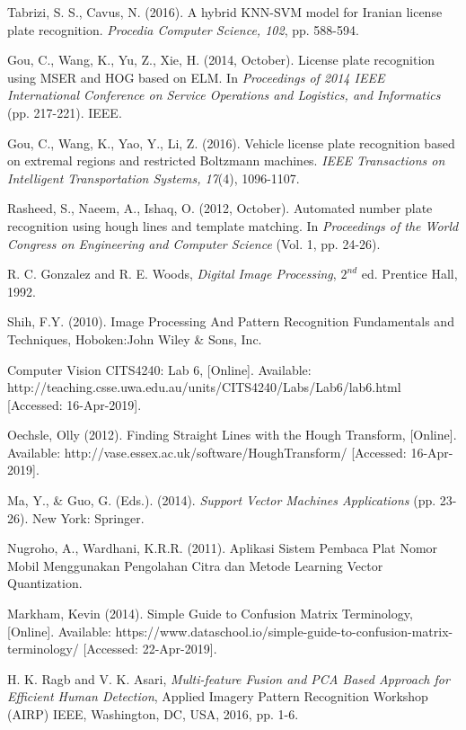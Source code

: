 \begin{thebibliography}{7}

{Tabrizi, S. S., Cavus, N. (2016). A hybrid KNN-SVM model for Iranian license plate recognition. \emph{Procedia Computer Science, 102}, pp. 588-594.}

{Gou, C., Wang, K., Yu, Z., Xie, H. (2014, October). License plate recognition using MSER and HOG based on ELM. In \emph{Proceedings of 2014 IEEE International Conference on Service Operations and Logistics, and Informatics} (pp. 217-221). IEEE.}

{Gou, C., Wang, K., Yao, Y., Li, Z. (2016). Vehicle license plate recognition based on extremal regions and restricted Boltzmann machines. \emph{IEEE Transactions on Intelligent Transportation Systems, 17}(4), 1096-1107.}

{Rasheed, S., Naeem, A., Ishaq, O. (2012, October). Automated number plate recognition using hough lines and template matching. In \emph{Proceedings of the World Congress on Engineering and Computer Science} (Vol. 1, pp. 24-26).}

{R. C. Gonzalez and R. E. Woods, \emph{Digital Image Processing}, $2^{nd}$ ed. Prentice Hall, 1992.}

{Shih, F.Y. (2010). Image Processing And Pattern Recognition Fundamentals and Techniques, Hoboken:John Wiley \& Sons, Inc.}

{Computer Vision CITS4240: Lab 6, [Online]. Available: http://teaching.csse.uwa.edu.au/units/CITS4240/Labs/Lab6/lab6.html [Accessed: 16-Apr-2019].}

{Oechsle, Olly (2012). Finding Straight Lines with the Hough Transform, [Online]. Available: http://vase.essex.ac.uk/software/HoughTransform/ [Accessed: 16-Apr-2019].}

{Ma, Y., \& Guo, G. (Eds.). (2014). \textit{Support Vector Machines Applications} (pp. 23-26). New York: Springer.}

{Nugroho, A., Wardhani, K.R.R. (2011). Aplikasi Sistem Pembaca Plat Nomor Mobil Menggunakan Pengolahan Citra dan Metode Learning Vector Quantization.}

{Markham, Kevin (2014). Simple Guide to Confusion Matrix Terminology, [Online]. Available: https://www.dataschool.io/simple-guide-to-confusion-matrix-terminology/ [Accessed: 22-Apr-2019].}

{H. K. Ragb and V. K. Asari, \emph{Multi-feature Fusion and PCA Based Approach for Efficient Human Detection}, Applied Imagery Pattern Recognition Workshop (AIRP) IEEE, Washington, DC, USA, 2016, pp. 1-6.}


\end{thebibliography}

